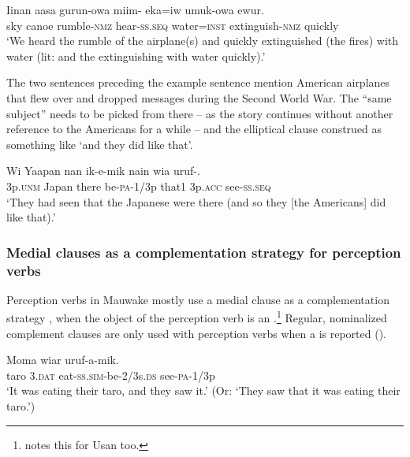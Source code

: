 \ea%
\label{ex:8:x1498}
\gll Iinan  aasa  gurun-owa  miim-  eka=iw  umuk-owa ewur. \\
sky  canoe  rumble-\textsc{nmz} hear-\textsc{ss}.\textsc{seq} water=\textsc{inst} extinguish-\textsc{nmz} quickly\\
\glt`We heard the rumble of the airplane(s) and quickly extinguished (the fires) with water (lit: and the extinguishing with water quickly).'
\z


The two sentences preceding the example sentence  mention American airplanes that flew over and dropped messages during the Second World War. The ``same subject'' needs to be picked from there -- as the story continues without another reference to the Americans for a while -- and the elliptical clause construed as something like  `and they did like that'.

\ea%
\label{ex:8:x1499}
\gll Wi  Yaapan  nan  ik-e-mik  nain  wia  uruf-.  \\
3p.\textsc{unm} Japan  there  be-\textsc{pa}-1/3p  that1  3p.\textsc{acc} see-\textsc{ss}.\textsc{seq}\\
\glt`They had seen that the Japanese were there (and so they [the Americans] did like that).'
\z


\subsubsection{Medial clauses as a complementation strategy for perception verbs} \label{sec:8.2.3.4}

Perception verbs in Mauwake mostly use a medial clause as a complementation strategy \citep[371]{Dixon2010}, when the object of the perception verb is an .\footnote{\citet[237]{Reesink1983} notes this for Usan too.} Regular, nominalized complement clauses are only used with perception verbs when a  is reported ().

\ea%
\label{ex:8:x1509}
\gll Moma  wiar    uruf-a-mik. \\
taro  3.\textsc{dat} eat-\textsc{ss}.\textsc{sim}-be-2/3s.\textsc{ds}  see-\textsc{pa}-1/3p      \\
\glt`It was eating their taro, and they saw it.' (Or: `They saw that it was eating their taro.')
\z


